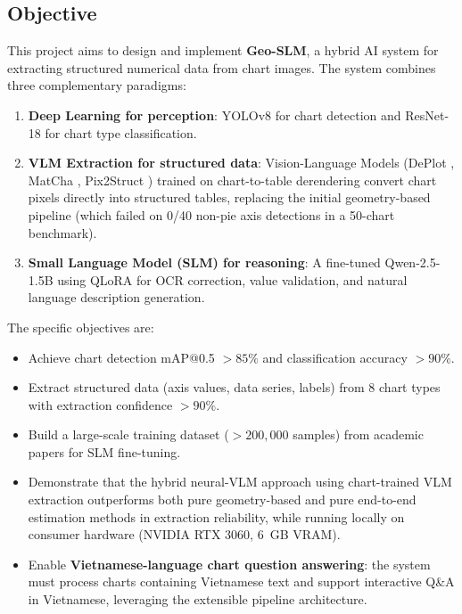 \subsection{Objective}

This project aims to design and implement \textbf{Geo-SLM}, a hybrid AI system for
extracting structured numerical data from chart images. The system combines three
complementary paradigms:

\begin{enumerate}
    \item \textbf{Deep Learning for perception}: YOLOv8 \cite{jocher2023yolov8} for chart
          detection and ResNet-18 \cite{he2016resnet} for chart type classification.
    \item \textbf{VLM Extraction for structured data}: Vision-Language Models
          (DePlot \cite{liu2023deplot}, MatCha \cite{lee2023matcha}, Pix2Struct
          \cite{lee2023pix2struct}) trained on chart-to-table derendering convert
          chart pixels directly into structured tables, replacing the initial
          geometry-based pipeline (which failed on 0/40 non-pie axis detections
          in a 50-chart benchmark).
    \item \textbf{Small Language Model (SLM) for reasoning}: A fine-tuned Qwen-2.5-1.5B
          \cite{yang2024qwen2} using QLoRA \cite{dettmers2024qlora} for OCR correction,
          value validation, and natural language description generation.
\end{enumerate}

The specific objectives are:
\begin{itemize}
    \item Achieve chart detection mAP@0.5 $> 85\%$ and classification accuracy $> 90\%$.
    \item Extract structured data (axis values, data series, labels) from 8 chart types
          with extraction confidence $> 90\%$.
    \item Build a large-scale training dataset ($> 200{,}000$ samples) from academic papers
          for SLM fine-tuning.
    \item Demonstrate that the hybrid neural-VLM approach using chart-trained
          VLM extraction outperforms both pure geometry-based and pure end-to-end
          estimation methods in extraction reliability, while running locally on
          consumer hardware (NVIDIA RTX 3060, 6~GB VRAM).
    \item Enable \textbf{Vietnamese-language chart question answering}: the system must
          process charts containing Vietnamese text and support interactive Q\&A in
          Vietnamese, leveraging the extensible pipeline architecture.
\end{itemize}

